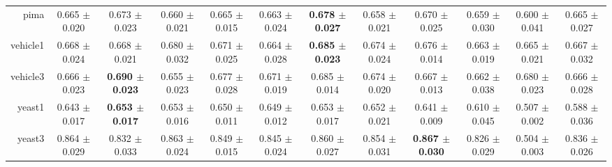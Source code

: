 \begin{table}[!ht]
{\begin{tabular}{r c c c c c c c c c c c}
pima & 0.665 $\pm$ 0.020 & 0.673 $\pm$ 0.023 & 0.660 $\pm$ 0.021 & 0.665 $\pm$ 0.015 & 0.663 $\pm$ 0.024 & \textbf{0.678 $\pm$ 0.027} & 0.658 $\pm$ 0.021 & 0.670 $\pm$ 0.025 & 0.659 $\pm$ 0.030 & 0.600 $\pm$ 0.041 & 0.665 $\pm$ 0.027 \\
vehicle1 & 0.668 $\pm$ 0.024 & 0.668 $\pm$ 0.021 & 0.680 $\pm$ 0.032 & 0.671 $\pm$ 0.025 & 0.664 $\pm$ 0.028 & \textbf{0.685 $\pm$ 0.023} & 0.674 $\pm$ 0.024 & 0.676 $\pm$ 0.014 & 0.663 $\pm$ 0.019 & 0.665 $\pm$ 0.021 & 0.667 $\pm$ 0.032 \\
vehicle3 & 0.666 $\pm$ 0.023 & \textbf{0.690 $\pm$ 0.023} & 0.655 $\pm$ 0.023 & 0.677 $\pm$ 0.028 & 0.671 $\pm$ 0.019 & 0.685 $\pm$ 0.014 & 0.674 $\pm$ 0.020 & 0.667 $\pm$ 0.013 & 0.662 $\pm$ 0.038 & 0.680 $\pm$ 0.023 & 0.666 $\pm$ 0.028 \\
yeast1 & 0.643 $\pm$ 0.017 & \textbf{0.653 $\pm$ 0.017} & 0.653 $\pm$ 0.016 & 0.650 $\pm$ 0.011 & 0.649 $\pm$ 0.012 & 0.653 $\pm$ 0.017 & 0.652 $\pm$ 0.021 & 0.641 $\pm$ 0.009 & 0.610 $\pm$ 0.045 & 0.507 $\pm$ 0.002 & 0.588 $\pm$ 0.036 \\
yeast3 & 0.864 $\pm$ 0.029 & 0.832 $\pm$ 0.033 & 0.863 $\pm$ 0.024 & 0.849 $\pm$ 0.015 & 0.845 $\pm$ 0.024 & 0.860 $\pm$ 0.027 & 0.854 $\pm$ 0.031 & \textbf{0.867 $\pm$ 0.030} & 0.826 $\pm$ 0.029 & 0.504 $\pm$ 0.003 & 0.836 $\pm$ 0.026 \\
\end{tabular}}
\end{table}
